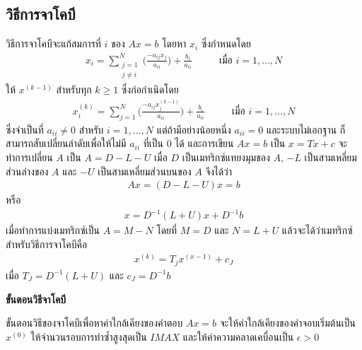 \subsection{วิธีการจาโคบี}
วิธีการจาโคบีจะแก้สมการที่ $i$ ของ $Ax = b$ โดยหา $x_i$ ซึ่งกำหนดโดย
\begin{align}
    x_i = \sum_{\substack{j=1 \\ j\neq i}}^{N} \Big( \frac{- a_{ij}x_j}{a_{ii}} \Big) + \frac{b_i}{a_{ii}} \hspace{1cm}\text{ เมื่อ } i=1,...,N
\end{align}
ให้ $x^{(k-1)}$ สำหรับทุก $k \geq 1$ ซึ่งก่อกำเนิดโดย
\begin{align}
    x_i^{(k)} = \sum_{j=1}^{N}  \Big( \frac{- a_{ij}x_j^{(k-1)}}{a_{ii}} \Big) + \frac{b_i}{a_{ii}} \hspace{1cm}\text{ เมื่อ } i=1,...,N
\end{align}
ซึ่งจำเป็นที่ $a_{ii} \neq 0$ สำหรับ $i = 1,..., N $ แต่ถ้ามีอย่างน้อยหนึ่ง $a_{ii} = 0$ และระบบไม่เอกฐาน ก็สามารถสับเปลี่ยนลำดับเพื่อให้ไม่มี $a_{ii}$ ที่เป็น 0 ได้ และการเขียน $Ax = b$ เป็น $x = Tx +c$ จะทำการเปลี่ยน $A$ เป็น $A = D - L - U$ เมื่อ $D$ เป็นเมทริกซ์แทยงมุมของ $A$, $-L$ เป็นสามเหลี่ยมส่วนล่างของ $A$ และ $-U$ เป็นสามเหลี่ยมส่วนบนของ $A$ จึงได้ว่า
\begin{align}
    Ax = (D - L - U)x = b    
\end{align}
หรือ
\begin{align}
    x = D^{-1} (L+U)x + D^{-1}b
\end{align}
เมื่อทำการแบ่งเมทริกซ์เป็น $A = M - N$ โดยที่ $M = D$ และ $N = L + U$ แล้วจะได้ว่าเมทริกซ์สำหรับวิธีการจาโคบีคือ
\begin{align}
    x^(k) = T_{j}x^(x-1) + c_J
\end{align}
เมื่อ $T_J = D^{-1}(L+U)$ และ $c_J = D^{-1}b$

\textbf{ขั้นตอนวิธีจาโคบี}

ขั้นตอนวิธีของจาโคบีเพื่อหาค่าใกล้เคียงของคำตอบ $Ax = b$ จะให้ค่าใกล้เคียงของคำจอบเริ่มต้นเป็น $x^{(0)}$ ให้จำนวนรอบการทำซ้ำสูงสุดเป็น $IMAX$ และให้ค่าความคลาดเคบื่อนเป็น $\epsilon > 0$



